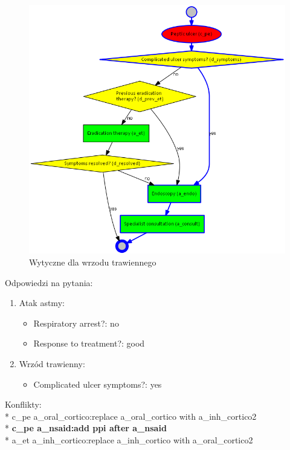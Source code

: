 \newpage
\begin{figure}[H]
\centering
\includegraphics[scale=0.5]{img/peptic-ulcer.png}
\caption{Wytyczne dla wrzodu trawiennego}
\label{fig:pu}
\end{figure}
\newpage
\noindent Odpowiedzi na pytania:
\begin{enumerate}
\item{Atak astmy:
	\begin{itemize}
	\item{Respiratory arrest?: no}
	\item{Response to treatment?: good}
	\end{itemize}
}
\item{Wrzód trawienny:
	\begin{itemize}
	\item{Complicated ulcer symptoms?: yes}
	\end{itemize}
}
\end{enumerate}
Konflikty:\\*
c\_pe a\_oral\_cortico:replace a\_oral\_cortico with a\_inh\_cortico2\\*
\textbf{c\_pe a\_nsaid:add ppi after a\_nsaid}\\*
a\_et a\_inh\_cortico:replace a\_inh\_cortico with a\_oral\_cortico2
\newpage

